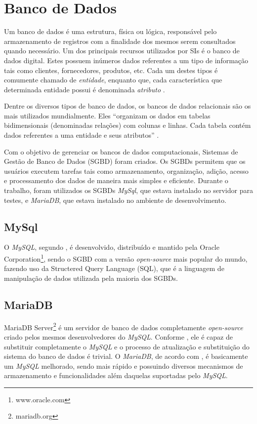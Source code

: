 \documentclass[
  12pt,       %
  openright,      %
  oneside,      %
  a4paper,      %
  english,      %
  french,        %
  spanish,     %
  brazil        %
  ]{abntex2-decsi}
\begin{document}
    \section{Banco de Dados}
   
   Um banco de dados é uma estrutura, física ou lógica, responsável pelo armazenamento de registros com a finalidade dos mesmos serem consultados quando necessário. Um dos principais recursos utilizados por SIs é o banco de dados digital. Estes possuem inúmeros dados referentes a um tipo de informação tais como clientes, fornecedores, produtos, etc. Cada um destes tipos é comumente chamado de \textit{entidade}, enquanto que, cada característica que determinada entidade possui é denominada \textit{atributo} \cite[p. 145]{laudon:2010}.
   
	Dentre os diversos tipos de banco de dados, os bancos de dados relacionais são os mais utilizados mundialmente. Eles ``organizam os dados em tabelas bidimensionais (denominadas relações) com colunas e linhas. Cada tabela contém dados referentes a uma entidade e seus atributos'' \cite[p. 145]{laudon:2010}. 

	Com o objetivo de gerenciar os bancos de dados computacionais, Sistemas de Gestão de Banco de Dados (SGBD) foram criados. Os SGBDs permitem que os usuários executem tarefas tais como armazenamento, organização, adição, acesso e processamento dos dados de maneira mais simples e eficiente. Durante o trabalho, foram utilizados os SGBDs \textit{MySql}, que estava instalado no servidor para testes, e \textit{MariaDB}, que estava instalado no ambiente de desenvolvimento.  
   
   \subsection{MySql}
      
      O \textit{MySQL}, segundo , é desenvolvido, distribuído e mantido pela Oracle Corporation\footnote{www.oracle.com}, sendo o SGBD com a versão \textit{open-source} mais popular do mundo, fazendo uso da Structered Query Language (SQL), que é a linguagem de manipulação de dados utilizada pela maioria dos SGBDs.
      
      \subsection{MariaDB}
      
      MariaDB Server\footnote{mariadb.org} é um servidor de banco de dados completamente \textit{open-source} criado pelos mesmos desenvolvedores do \textit{MySQL}. Conforme , ele é capaz de substituir completamente o \textit{MySQL} e o processo de atualização e substituição do sistema do banco de dados é trivial. O \textit{MariaDB}, de acordo com , é basicamente um \textit{MySQL} melhorado, sendo mais rápido e possuindo diversos mecanismos de armazenamento e funcionalidades além daquelas suportadas pelo \textit{MySQL}.
      
\end{document}
